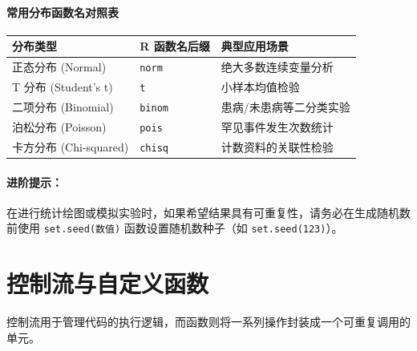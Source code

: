 \paragraph{常用分布函数名对照表}
\begin{table}[h]
\centering
\renewcommand{\arraystretch}{1.5}
\begin{tabular}{|l|l|l|}
\hline
\textbf{分布类型} & \textbf{R 函数名后缀} & \textbf{典型应用场景} \\ \hline
正态分布 (Normal) & \texttt{norm} & 绝大多数连续变量分析 \\ \hline
T 分布 (Student's t) & \texttt{t} & 小样本均值检验 \\ \hline
二项分布 (Binomial) & \texttt{binom} & 患病/未患病等二分类实验 \\ \hline
泊松分布 (Poisson) & \texttt{pois} & 罕见事件发生次数统计 \\ \hline
卡方分布 (Chi-squared) & \texttt{chisq} & 计数资料的关联性检验 \\ \hline
\end{tabular}
\end{table}

\paragraph{进阶提示：}
在进行统计绘图或模拟实验时，如果希望结果具有可重复性，请务必在生成随机数前使用 \texttt{set.seed(数值)} 函数设置随机数种子（如 \texttt{set.seed(123)}）。


\section{控制流与自定义函数}

控制流用于管理代码的执行逻辑，而函数则将一系列操作封装成一个可重复调用的单元。

